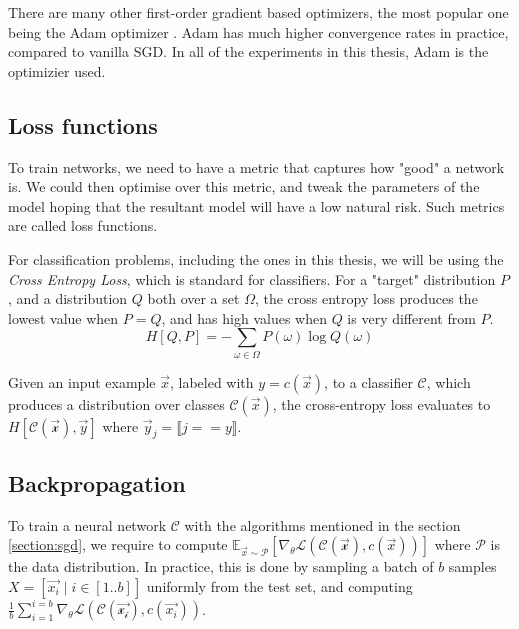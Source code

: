 \documentclass[12pt, oneside]{book}
\begin{document}
There are many other first-order gradient based optimizers, the most popular one
being the Adam optimizer \citep{Adam}. Adam has much higher convergence rates in
practice, compared to vanilla SGD. In all of the experiments in this thesis,
Adam is the optimizier used. %

\subsection{Loss functions}
To train networks, we need to have a metric that captures how "good" a network
is. We could then optimise over this metric, and tweak the parameters of the
model hoping that the resultant model will have a low natural risk. Such metrics
are called loss functions.

For classification problems, including the ones in this thesis, we will be using
the \emph{Cross Entropy Loss}, which is standard for classifiers. For a "target"
distribution $P$, and a distribution $Q$ both over a set $\Omega$, the cross
entropy loss produces the lowest value when $P=Q$, and has high values when $Q$
is very different from $P$.
\begin{equation*}
    H[Q, P] = -\sum_{\omega \in \Omega} P(\omega) \log Q(\omega)
\end{equation*}

Given an input example $\vec{x}$, labeled with $y=c(\vec{x})$, to a classifier
$\mathcal{C}$, which produces a distribution over classes
$\mathcal{C}(\vec{x})$, the cross-entropy loss evaluates to
$H[\mathcal{C(\mathcal{\vec{x}})}, \vec{y}]$ where $\vec{y}_j=\llbracket j == y
\rrbracket$.

\subsection{Backpropagation}
To train a neural network $\mathcal{C}$ with the algorithms mentioned in the
section \ref{section:sgd}, we require to compute $\mathbb{E}_{\vec{x} \sim
\mathcal{P}}[\nabla_\theta \mathcal{L}(\mathcal{C(\vec{x})}, c(\vec{x}))]$ where
$\mathcal{P}$ is the data distribution. In practice, this is done by sampling a
batch of $b$ samples $X=[\vec{x_i}\mid i \in [1..b]]$ uniformly from the test
set, and computing $\frac{1}{b} \sum_{i=1}^{i=b} \nabla_\theta
\mathcal{L}(\mathcal{C(\vec{x_i})}, c(\vec{x_i}))$.
\end{document}

